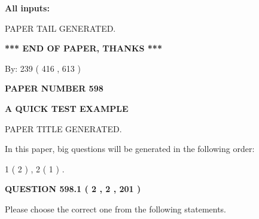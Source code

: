 \documentclass[12pt]{article}
\begin{document}
   
   
   
\noindent{}
   
   
   
   
\noindent\vspace{0.1in}\hspace{-0.08in} {\textbf{\Large{All inputs: }}}
   
   
   
   
   
   
 \vspace{0.2in}
 
   
   
\vspace{2.0in} PAPER TAIL GENERATED.
   
   
   
   
\vspace{1.0in} 
{\textbf{\large{ *** END OF PAPER, THANKS *** }}} 
   
   
\hspace{1.0in} By: 
 239 ( 416 ,  613 )
   
   
   
   
\newpage 
\setcounter{page}{ 
   598001 } 
   
   
   
   
 {\textbf{ \Large{ PAPER NUMBER  598  }}}
   
   
\vspace{0.2in}
   
   
   
   
   
   
   
   
 \vspace{0.2in}
{\LARGE {\textbf{ A QUICK TEST EXAMPLE}}}
   
   
 PAPER TITLE GENERATED.
   
   
   
\vspace{0.2in}
   
In this paper, big questions will be generated in the following order: 
   
   
   1 ( 2 )
 ,
   2 ( 1 )
 .
  
\vspace{0.2in}
  
{\textbf{\Large{QUESTION
598.1 
 ( 2 , 2 , 201 )
}}}
  
  
Please choose the correct one from the following statements.
 
\end{document}
